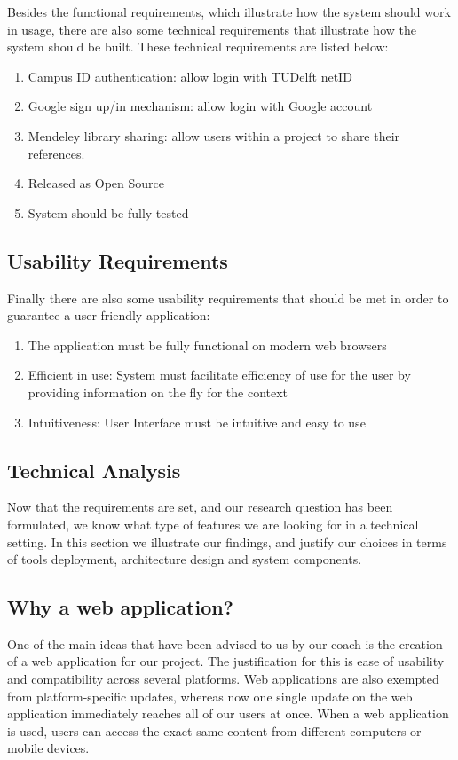 Besides the functional requirements, which illustrate how the system should work in usage, there are also some technical requirements that illustrate how the system should be built. These technical requirements are listed below:

\begin{enumerate}
	\item Campus ID authentication: allow login with TUDelft netID
	\item Google sign up/in mechanism: allow login with Google account
	\item Mendeley library sharing: allow users within a project to share their references.
	\item Released as Open Source
 	\item System should be fully tested 
\end{enumerate}

\subsection{Usability Requirements} %

Finally there are also some usability requirements that should be met in order to guarantee a user-friendly application:

\label{sub:usability_requirements}
\begin{enumerate}
	\item The application must be fully functional on modern web browsers
	\item Efficient in use: System must facilitate efficiency of use for the user by providing information on the fly for the context
	\item Intuitiveness: User Interface must be intuitive and easy to use
\end{enumerate}
\newpage
\subsection{Technical Analysis} %

Now that the requirements are set, and our research question has been formulated, we know what type of features we are looking for in a technical setting. In this section we illustrate our findings, and justify our choices in terms of tools deployment, architecture design and system components.

\subsection{Why a web application?}
One of the main ideas that have been advised to us by our coach is the creation of a web application for our project. The justification for this is ease of usability and compatibility across several platforms. Web applications are also exempted from platform-specific updates, whereas now one single update on the web application immediately reaches all of our users at once. When a web application is used, users can access the exact same content from different computers or mobile devices.
